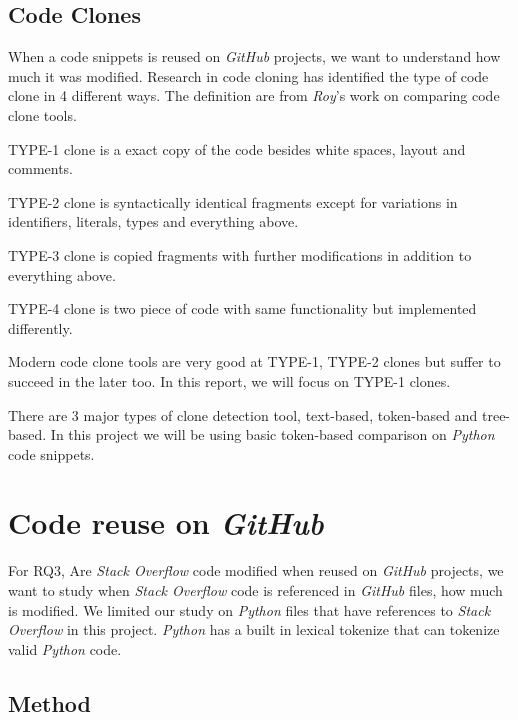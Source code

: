 \documentclass[sigconf]{acmart}
\begin{document}
\subsection{Code Clones}
When a code snippets is reused on \textit{GitHub} projects, we want to understand how much it was modified. Research in code cloning has identified the type of code clone in 4 different ways. The definition are from \textit{Roy}'s work on comparing code clone tools. \cite{Roy:2009:CEC:1530898.1531101}

\textsc{TYPE-1} clone is a exact copy of the code besides white spaces, layout and comments.

\textsc{TYPE-2} clone is syntactically identical fragments except for variations in identifiers, literals, types and everything above.

\textsc{TYPE-3} clone is copied fragments with further modifications in addition to everything above. 

\textsc{TYPE-4} clone is two piece of code with same functionality but implemented differently.

Modern code clone tools are very good at {\sc TYPE-1, TYPE-2} clones but suffer to succeed in the later too. In this report, we will focus on TYPE-1 clones.

There are 3 major types of clone detection tool, text-based, token-based and tree-based. In this project we will be using basic token-based comparison on \textit{Python} code snippets.

\section{Code reuse on \textit{GitHub}}

For RQ3, Are \textit{Stack Overflow} code modified when reused on \textit{GitHub} projects, we want to study when \textit{Stack Overflow} code is referenced in \textit{GitHub} files, how much is modified. We limited our study on \textit{Python} files that have references to \textit{Stack Overflow} in this project. \textit{Python} has a built in lexical tokenize that can tokenize valid \textit{Python} code.

\subsection{Method}
\end{document}
